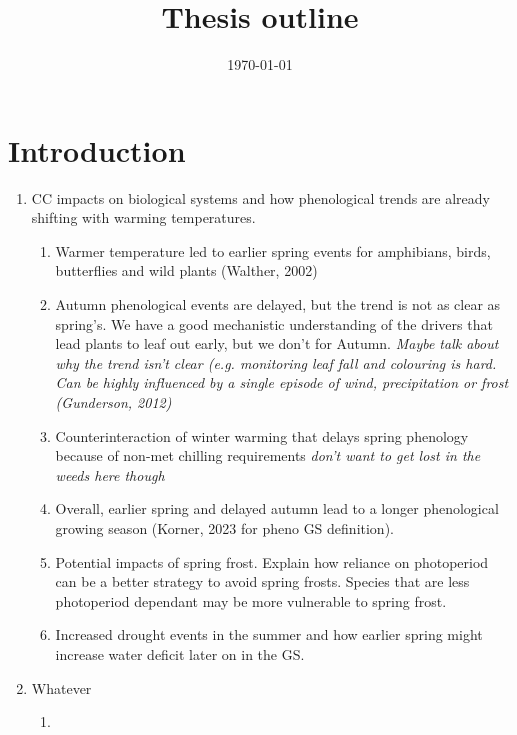 \documentclass{article}
\title{Thesis outline}
\date{\today}
\begin{document}

\maketitle
\section*{Introduction}



\begin{enumerate}

\item CC impacts on biological systems and how phenological trends are already shifting with warming temperatures. 

\begin{enumerate}
\item Warmer temperature led to earlier spring events for amphibians, birds, butterflies and wild plants (Walther, 2002)
\item Autumn phenological events are delayed, but the trend is not as clear as spring's. We have a good mechanistic understanding of the drivers that lead plants to leaf out early, but we don't for Autumn. \textit{Maybe talk about why the trend isn't clear (e.g. monitoring leaf fall and colouring is hard. Can be highly influenced by a single episode of wind, precipitation or frost (Gunderson, 2012)}  
\item Counterinteraction of winter warming that delays spring phenology because of non-met chilling requirements \textit{don't want to get lost in the weeds here though}
\item Overall, earlier spring and delayed autumn lead to a longer phenological growing season (Korner, 2023 for pheno GS definition).
\item Potential impacts of spring frost. Explain how reliance on photoperiod can be a better strategy to avoid spring frosts. Species that are less photoperiod dependant may be more vulnerable to spring frost.
\item Increased drought events in the summer and how earlier spring might increase water deficit later on in the GS.
\end{enumerate}

\item Whatever

\begin{enumerate}
\item 
\end{enumerate}  %
\end{enumerate}

\end{document}
